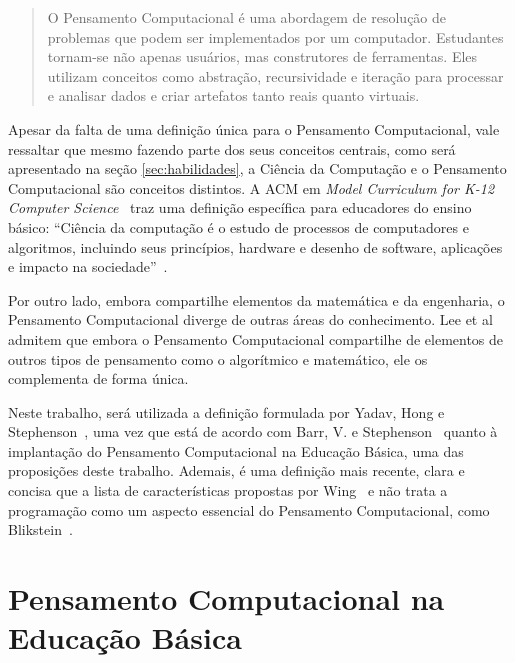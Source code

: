 \begin{quote}
O Pensamento Computacional é uma abordagem de resolução de problemas que podem ser implementados por um computador. Estudantes tornam-se não apenas usuários, mas construtores de ferramentas. Eles utilizam conceitos como abstração, recursividade e iteração para processar e analisar dados e criar artefatos tanto reais quanto virtuais. ~\cite[~p.51, tradução das autoras]{barr_bringing_2011}
\end{quote}

Apesar da falta de uma definição única para o Pensamento Computacional, vale ressaltar que mesmo fazendo parte dos seus conceitos centrais, como será apresentado na seção \ref{sec:habilidades}, a Ciência da Computação e o Pensamento Computacional são conceitos distintos. A \acrshort{ACM} em \textit{Model Curriculum for K-12 Computer Science}~\cite{tucker_model_2003} traz uma definição específica para educadores do ensino básico: “Ciência da computação é o estudo de processos de computadores e algoritmos, incluindo seus princípios, hardware e desenho de software, aplicações e impacto na sociedade”~\cite[~p.6, tradução das autoras]{tucker_model_2003}. 

Por outro lado, embora compartilhe elementos da matemática e da engenharia, o Pensamento Computacional diverge de outras áreas do conhecimento. Lee et al~\cite{lee_computational_2011} admitem que embora o Pensamento Computacional compartilhe de elementos de outros tipos de pensamento como o algorítmico e matemático, ele os complementa de forma única. 

Neste trabalho, será utilizada a definição formulada por Yadav, Hong e Stephenson~\cite{yadav_computational_2016}, uma vez que está de acordo com Barr, V. e Stephenson~\cite{barr_bringing_2011} quanto à implantação do Pensamento Computacional na Educação Básica, uma das proposições deste trabalho. Ademais, é uma definição mais recente, clara e concisa que a lista de características propostas por Wing~\cite{wing_computational_2006} e não trata a programação como um aspecto essencial do Pensamento Computacional, como Blikstein~\cite{blikstein_o_2008}.

\section{Pensamento Computacional na Educação Básica}\label{sec:pc_educacao_basica}


